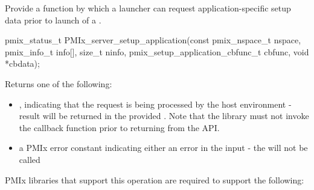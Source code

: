 \summary

Provide a function by which a launcher can request application-specific setup data prior to launch of a .

\format

\cspecificstart
\begin{codepar}
pmix_status_t
PMIx_server_setup_application(const pmix_nspace_t nspace,
                        pmix_info_t info[], size_t ninfo,
                        pmix_setup_application_cbfunc_t cbfunc,
                        void *cbdata);
\end{codepar}
\cspecificend

\begin{arglist}
\end{arglist}

Returns one of the following:

\begin{itemize}
    \item {}, indicating that the request is being processed by the host environment - result will be returned in the provided . Note that the library must not invoke the callback function prior to returning from the \ac{API}.
    \item a PMIx error constant indicating either an error in the input - the  will not be called
\end{itemize}


\reqattrstart
\ac{PMIx} libraries that support this operation are required to support the following:


\reqattrend

